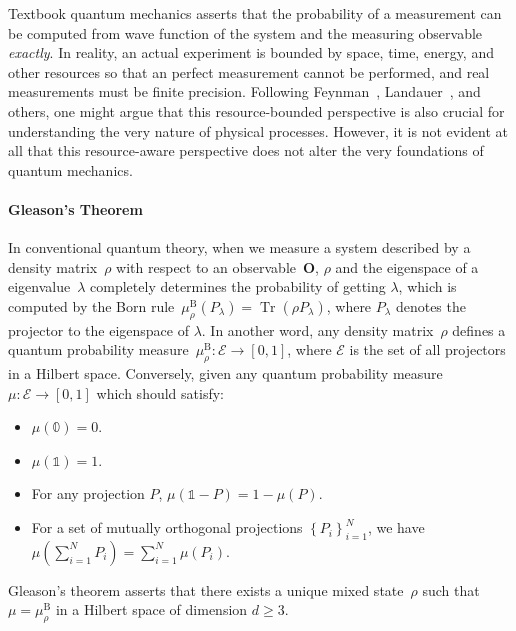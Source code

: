 \documentclass[reprint, aps, prl,superscriptaddress, showpacs,
showkeys]{revtex4-1}
\theoremstyle{plain}
\theoremstyle{definition}
\newcommand{\events}{\ensuremath{\mathcal{E}}}
\newcommand{\Tr}{\mathop{\mathrm{Tr}}\nolimits}
\begin{document}
\maketitle

Textbook quantum mechanics asserts that the probability of a measurement
can be computed from wave function of the system and the measuring
observable \emph{exactly}. In reality, an actual experiment is bounded
by space, time, energy, and other resources so that an perfect measurement
cannot be performed, and real measurements must be finite precision.
Following Feynman~\citep{Feynman1982Simulating}, Landauer~\citep{Landauer1996188},
and others, one might argue that this resource-bounded perspective
is also crucial for understanding the very nature of physical processes.
However, it is not evident at all that this resource-aware perspective
does not alter the very foundations of quantum mechanics.

\paragraph{Gleason's Theorem}

In conventional quantum theory, when we measure a system described
by a density matrix~$\rho$ with respect to an observable~$\mathbf{O}$,
$\rho$ and the eigenspace of a eigenvalue~$\lambda$ completely
determines the probability of getting $\lambda$, which is computed
by the Born rule~$\mu_{\rho}^{\mathrm{\mathrm{B}}}\left(P_{\lambda}\right)=\Tr\left(\rho P_{\lambda}\right)$,
where $P_{\lambda}$ denotes the projector to the eigenspace of $\lambda$.
In another word, any density matrix~$\rho$ defines a quantum probability
measure~$\mu_{\rho}^{\mathrm{\mathrm{B}}}:\events\rightarrow[0,1]$,
where $\events$ is the set of all projectors in a Hilbert space.
Conversely, given any quantum probability measure~$\mu:\events\rightarrow[0,1]$
which should satisfy:
\begin{itemize}
\item $\mu(\mathbb{0})=0$. 
\item $\mu(\mathbb{1})=1$. 
\item For any projection $P$, $\mu\left(\mathbb{1}-P\right)=1-\mu\left(P\right)$. 
\item For a set of mutually orthogonal projections $\left\{ P_{i}\right\} _{i=1}^{N}$,
we have $\mu\left(\sum_{i=1}^{N}P_{i}\right)=\sum_{i=1}^{N}\mu\left(P_{i}\right)$. 
\end{itemize}
Gleason's theorem asserts that there exists a unique mixed state~$\rho$
such that $\mu=\mu_{\rho}^{\mathrm{\mathrm{B}}}$ in a Hilbert space
of dimension $d\geq3$.
\end{document}
